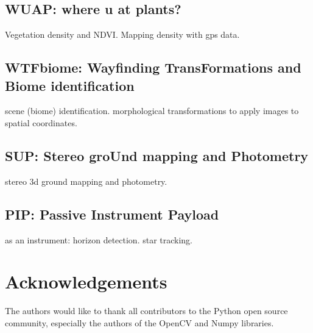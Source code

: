 \documentclass[conference]{IEEEtran} %
\begin{document}
\subsection{WUAP: where u at plants?}
Vegetation density and NDVI. Mapping density with gps data.

\subsection{WTFbiome: Wayfinding TransFormations and Biome identification}
scene (biome) identification.
morphological transformations to apply images to spatial coordinates.

\subsection{SUP: Stereo groUnd mapping and Photometry}
stereo 3d ground mapping and photometry.

\subsection{PIP: Passive Instrument Payload}
as an instrument: horizon detection. star tracking.

\section*{Acknowledgements}
The authors would like to thank all contributors to the Python open source community, especially the authors of the OpenCV and Numpy libraries.




\onecolumn
\appendices{}
\end{document}
